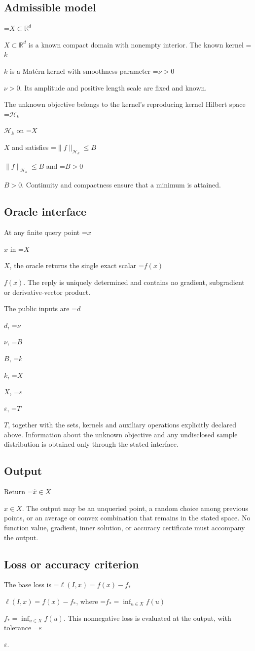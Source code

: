 \documentclass[10pt,a4paper]{article}
\newcommand{\AtlasMath}[1]{\par\begingroup\centering\setbox0=\hbox{$\displaystyle #1$}\ifdim\wd0>1.4\linewidth\typeout{ATLAS WIDE FORMULA: \the\wd0}\fi\ifdim\wd0>\linewidth\resizebox{\linewidth}{!}{\box0}\else\box0\fi\par\endgroup}
\newcommand{\AtlasInlineMath}[1]{\begingroup\setbox0=\hbox{$#1$}\ifdim\wd0>.4\linewidth\endgroup\AtlasMath{#1}\else\endgroup$#1$\fi}
\begin{document}
\subsection{Admissible model}
\AtlasInlineMath{X\subset\mathbb{R}^d} is a known compact domain with nonempty interior. The known kernel \AtlasInlineMath{k} is a Matérn kernel with smoothness parameter \AtlasInlineMath{\nu>0}. Its amplitude and positive length scale are fixed and known.

The unknown objective belongs to the kernel's reproducing kernel Hilbert space \AtlasInlineMath{\mathcal{H}_k} on \AtlasInlineMath{X} and satisfies \AtlasInlineMath{\|f\|_{\mathcal{H}_k}\le B} and \AtlasInlineMath{B>0}. Continuity and compactness ensure that a minimum is attained.

\subsection{Oracle interface}
At any finite query point \AtlasInlineMath{x} in \AtlasInlineMath{X}, the oracle returns the single exact scalar \AtlasInlineMath{f(x)}. The reply is uniquely determined and contains no gradient, subgradient or derivative-vector product.

The public inputs are \AtlasInlineMath{d}, \AtlasInlineMath{\nu}, \AtlasInlineMath{B}, \AtlasInlineMath{k}, \AtlasInlineMath{X}, \AtlasInlineMath{\varepsilon}, \AtlasInlineMath{T}, together with the sets, kernels and auxiliary operations explicitly declared above. Information about the unknown objective and any undisclosed sample distribution is obtained only through the stated interface.

\subsection{Output}
Return \AtlasInlineMath{\widehat{x}\in X}. The output may be an unqueried point, a random choice among previous points, or an average or convex combination that remains in the stated space. No function value, gradient, inner solution, or accuracy certificate must accompany the output.

\subsection{Loss or accuracy criterion}
The base loss is \AtlasInlineMath{\ell(I,x)=f(x)-f_*}, where \AtlasInlineMath{f_*=\inf_{u\in X}f(u)}. This nonnegative loss is evaluated at the output, with tolerance \AtlasInlineMath{\varepsilon}.
\end{document}

